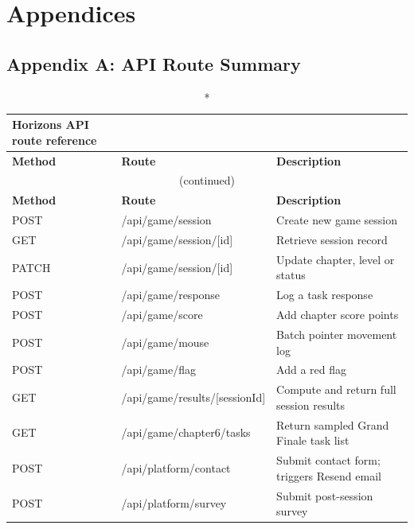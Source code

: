 \documentclass[12pt,a4paper,oneside]{report}
\renewcommand{\thechapter}{\Roman{chapter}}
\begin{document}
	\clearpage
	\appendix
	\chapter*{Appendices}
	\setcounter{chapter}{1}
	\renewcommand{\thechapter}{\Alph{chapter}}
	\setcounter{section}{0}
	
	\section*{Appendix A: API Route Summary}
	
	\begin{longtable}{llp{6cm}}
		\caption*{Horizons API route reference}\\
		\toprule
		\textbf{Method} & \textbf{Route} & \textbf{Description} \\
		\midrule
		\endfirsthead
		\multicolumn{3}{c}{\small(continued)}\\
		\toprule
		\textbf{Method} & \textbf{Route} & \textbf{Description} \\
		\midrule
		\endhead
		POST     & /api/game/session                    & Create new game session \\
		GET      & /api/game/session/[id]               & Retrieve session record \\
		PATCH    & /api/game/session/[id]               & Update chapter, level or status \\
		POST     & /api/game/response                   & Log a task response \\
		POST     & /api/game/score                      & Add chapter score points \\
		POST     & /api/game/mouse                      & Batch pointer movement log \\
		POST     & /api/game/flag                       & Add a red flag \\
		GET      & /api/game/results/[sessionId]        & Compute and return full session results \\
		GET      & /api/game/chapter6/tasks             & Return sampled Grand Finale task list \\
		POST     & /api/platform/contact                & Submit contact form; triggers Resend email \\
		POST     & /api/platform/survey                 & Submit post-session survey \\

\end{longtable}
\end{document}
